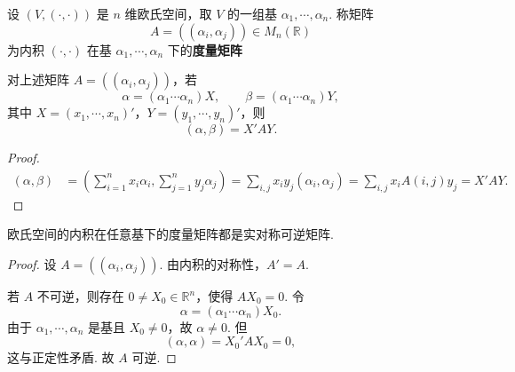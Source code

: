\begin{definition}\label{p1:concept:c6-l572}
	设 $(V,(\cdot,\cdot))$ 是 $n$ 维欧氏空间，取 $V$ 的一组基 $\alpha_1,\cdots,\alpha_n$. 称矩阵
	\[
	A=((\alpha_i,\alpha_j))\in M_n(\mathbb{R})
	\]
	为内积 $(\cdot,\cdot)$ 在基 $\alpha_1,\cdots,\alpha_n$ 下的\textbf{度量矩阵}
\end{definition}

\begin{lemma}
	对上述矩阵 $A=((\alpha_i,\alpha_j))$，若
	\[
	\alpha=(\alpha_1\cdots\alpha_n)X,
	\qquad
	\beta=(\alpha_1\cdots\alpha_n)Y,
	\]
	其中 $X=(x_1,\cdots,x_n)'$，$Y=(y_1,\cdots,y_n)'$，则
	\[
	(\alpha,\beta)=X'AY.
	\]
\end{lemma}
\begin{proof}

	\[
	\begin{aligned}
		(\alpha,\beta)
		&=\left(\sum_{i=1}^n x_i\alpha_i,\sum_{j=1}^n y_j\alpha_j\right)             =\sum_{i,j}x_i y_j(\alpha_i,\alpha_j)         =\sum_{i,j}x_iA(i,j)y_j=X'AY.
	\end{aligned}
	\]
\end{proof}

\begin{proposition}
	欧氏空间的内积在任意基下的度量矩阵都是实对称可逆矩阵.
\end{proposition}
\begin{proof}
	设 $A=((\alpha_i,\alpha_j))$. 由内积的对称性，$A'=A$.
	
	若 $A$ 不可逆，则存在 $0\ne X_0\in\mathbb{R}^n$，使得 $AX_0=0$. 令
	\[
	\alpha=(\alpha_1\cdots\alpha_n)X_0.
	\]
	由于 $\alpha_1,\cdots,\alpha_n$ 是基且 $X_0\ne0$，故 $\alpha\ne0$. 但
	\[
	(\alpha,\alpha)=X_0'AX_0=0,
	\]
	这与正定性矛盾. 故 $A$ 可逆.
\end{proof}

